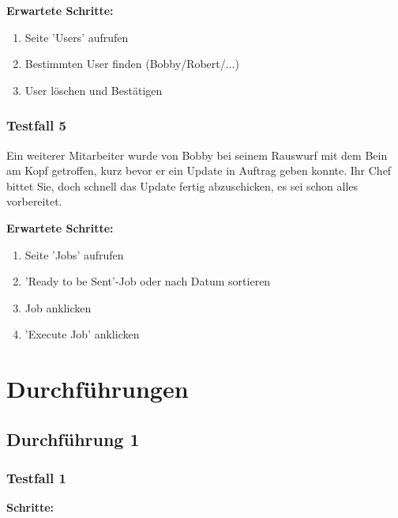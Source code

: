 {\bigskip
\textbf{Erwartete Schritte:}

\begin{enumerate}
    \item Seite 'Users' aufrufen
    \item Bestimmten User finden (Bobby/Robert/...)
    \item User löschen und Bestätigen
\end{enumerate}


\subsubsection*{Testfall 5}

Ein weiterer Mitarbeiter wurde von Bobby bei seinem Rauswurf mit dem Bein am Kopf getroffen, kurz bevor er ein Update in Auftrag geben konnte. Ihr Chef bittet Sie, doch schnell das Update fertig abzuschicken, es sei schon alles vorbereitet.

\bigskip
\textbf{Erwartete Schritte:}

\begin{enumerate}
    \item Seite 'Jobs' aufrufen
    \item 'Ready to be Sent'-Job oder nach Datum sortieren
    \item Job anklicken
    \item 'Execute Job' anklicken
\end{enumerate}





\section*{Durchführungen}



\subsection*{Durchführung 1}

\subsubsection*{Testfall 1}

\textbf{Schritte:}

}
